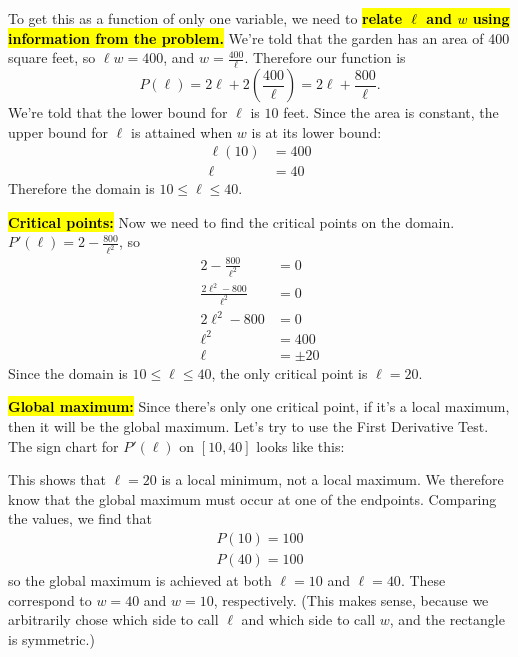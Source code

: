 \documentclass{article}
\newcommand{\highlight}[1]{\boldmath\hl{\textbf{#1}}\unboldmath}
\begin{document}
\begin{enumerate}
\begin{solution}
    To get this as a function of only one variable, we need to 
    \highlight{relate $\ell$ and $w$ using information from the problem.} We're told
    that the garden has an area of 400 square feet, so $\ell w =400$, and 
    $w = \frac{400}{\ell}$.
    Therefore our function is
    \[P(\ell) = 2\ell + 2\left(\frac{400}{\ell}\right) = 2\ell + \frac{800}{\ell}.\]
    We're told that the lower bound for $\ell$ is $10$ feet. Since the area is constant,
    the upper bound for $\ell$ is attained when $w$ is at its lower bound:
    \begin{align*}
        \ell (10) &= 400 \\
        \ell &= 40
    \end{align*}
    Therefore the domain is $10 \leq \ell \leq 40$.

    \highlight{Critical points:} Now we need to find the critical points on the domain.
    $P'(\ell) = 2 - \frac{800}{\ell^2}$, so
    \begin{align*}
      2 - \frac{800}{\ell^2} &= 0 \\
      \frac{2\ell^2 - 800}{\ell^2} &= 0 \\
      2\ell^2 - 800 &= 0 \\
      \ell^2 &= 400 \\
      \ell &= \pm 20
    \end{align*}
    Since the domain is $10 \leq \ell \leq 40$, the only critical point is $\ell = 20$.

    \highlight{Global maximum:} Since there's only one critical point, if it's
    a local maximum, then it will be the global maximum. Let's try to use the First Derivative
    Test. The sign chart for $P'(\ell)$ on $[10, 40]$ looks like this:
      \begin{center}
      \end{center}
      This shows that $\ell=20$ is a local minimum, not a local maximum. We therefore know
      that the global maximum must occur at one of the endpoints. Comparing the values,
      we find that
      \begin{align*}
        P(10) = 100 \\
        P(40) = 100
      \end{align*}
      so the global maximum is achieved at both $\ell = 10$ and $\ell = 40$. These
      correspond to $w=40$ and $w=10$, respectively.
      (This makes sense, because we arbitrarily chose which side to call $\ell$ 
      and which side to call $w$, and the rectangle is symmetric.)


\end{solution}
\end{enumerate}
\end{document}
